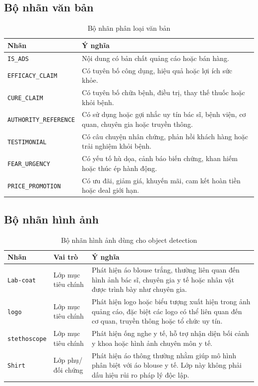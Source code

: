 \subsection{Bộ nhãn văn bản}
\begin{table}[H]
\centering
\caption{Bộ nhãn phân loại văn bản}
\label{tab:text_label_set}
\begin{tabularx}{\textwidth}{|L{0.34\textwidth}|Y|}
\hline
\textbf{Nhãn} & \textbf{Ý nghĩa} \\
\hline
\texttt{IS\_ADS} & Nội dung có bản chất quảng cáo hoặc bán hàng. \\ \hline
\texttt{EFFICACY\_CLAIM} & Có tuyên bố công dụng, hiệu quả hoặc lợi ích sức khỏe. \\ \hline
\texttt{CURE\_CLAIM} & Có tuyên bố chữa bệnh, điều trị, thay thế thuốc hoặc khỏi bệnh. \\ \hline
\texttt{AUTHORITY\_REFERENCE} & Có sử dụng hoặc gợi nhắc uy tín bác sĩ, bệnh viện, cơ quan, chuyên gia hoặc truyền thông. \\ \hline
\texttt{TESTIMONIAL} & Có câu chuyện nhân chứng, phản hồi khách hàng hoặc trải nghiệm khỏi bệnh. \\ \hline
\texttt{FEAR\_URGENCY} & Có yếu tố hù dọa, cảnh báo biến chứng, khan hiếm hoặc thúc ép hành động. \\ \hline
\texttt{PRICE\_PROMOTION} & Có ưu đãi, giảm giá, khuyến mãi, cam kết hoàn tiền hoặc deal giới hạn. \\ \hline
\end{tabularx}
\end{table}

\subsection{Bộ nhãn hình ảnh}
\begin{table}[H]
\centering
\caption{Bộ nhãn hình ảnh dùng cho object detection}
\label{tab:image_label_set}
\begin{tabularx}{\textwidth}{|L{0.22\textwidth}|L{0.20\textwidth}|Y|}
\hline
\textbf{Nhãn} & \textbf{Vai trò} & \textbf{Ý nghĩa} \\
\hline
\texttt{Lab-coat} & Lớp mục tiêu chính & Phát hiện áo blouse trắng, thường liên quan đến hình ảnh bác sĩ, chuyên gia y tế hoặc nhân vật được trình bày như chuyên gia. \\ \hline
\texttt{logo} & Lớp mục tiêu chính & Phát hiện logo hoặc biểu tượng xuất hiện trong ảnh quảng cáo, đặc biệt các logo có thể liên quan đến cơ quan, truyền thông hoặc tổ chức uy tín. \\ \hline
\texttt{stethoscope} & Lớp mục tiêu chính & Phát hiện ống nghe y tế, hỗ trợ nhận diện bối cảnh y khoa hoặc hình ảnh chuyên môn y tế. \\ \hline
\texttt{Shirt} & Lớp phụ/đối chứng & Phát hiện áo thông thường nhằm giúp mô hình phân biệt với áo blouse y tế. Lớp này không phải dấu hiệu rủi ro pháp lý độc lập. \\ \hline
\end{tabularx}
\end{table}

